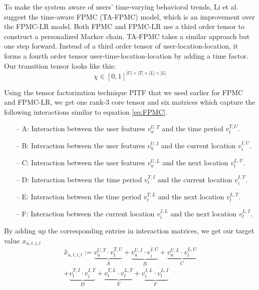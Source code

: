 \documentclass{sig-alternate}
\begin{document}
To make the system aware of users' time-varying behavioral trends, Li et al. \cite{Li:2017} suggest the time-aware FPMC (TA-FPMC) 
model, which is an improvement over the FPMC-LR model. Both FPMC and FPMC-LR use a third order tensor to 
construct a personalized Markov chain. TA-FPMC takes a similar approach but one step forward. Instead of a third order tensor of 
user-location-location, it forms a fourth order tensor user-time-location-location by adding a time factor. Our transition tensor looks like this: 
\begin{equation}
	\chi \in [0, 1]^{|U| \times |T| \times |L| \times |L|}
\label{eq:TA-FPMC_tensor}
\end{equation}

Using the tensor factorization technique PITF that we used earlier for FPMC and FPMC-LR, we get 
one rank-3 core tensor and six matrices which capture the following interactions similar to equation \ref{eq:FPMC}.

\begin{itemize}
\item[--] A: Interaction between the user features $v_u^{U,T}$ and the time period $v_t^{T,U}$.
\item[--] B: Interaction between the user features $v_u^{U,I}$ and the current location $v_i^{I,U}$.
\item[--] C: Interaction between the user features $v_u^{U,L}$ and the next location $v_l^{L,U}$.
\item[--] D: Interaction between the time period $v_t^{T,I}$ and the current location $v_i^{I,T}$.
\item[--] E: Interaction between the time period $v_t^{T,L}$ and the next location $v_l^{L,T}$.
\item[--] F: Interaction between the current location $v_i^{I,L}$ and the next location $v_l^{L,I}$.
\end{itemize}

By adding up the corresponding entries in interaction matrices, we get our target value $x_{u,t,i,l}$
\begin{equation}
\begin{split}
\hat{x}_{u,t,i,l} := \underbrace{v_u^{U,T} \cdot v_t^{T,U}}_{A} + \underbrace{v_u^{U,I} \cdot v_i^{I,U}}_{B} + 
								\underbrace{v_u^{U,L} \cdot v_l^{L,U}}_{C}  \\
	                        + \underbrace{v_t^{T,I} \cdot v_i^{I,T}}_{D} + \underbrace{v_t^{T,L} \cdot v_l^{L,T}}_{E} + 
	                        \underbrace{v_i^{I,L} \cdot v_l^{L,I}}_{F}
\end{split}
\label{eq:TAD-FPMC}
\end{equation}
\end{document}
